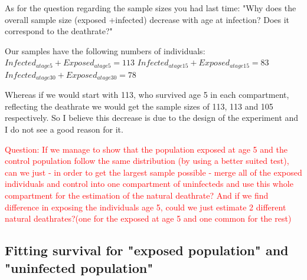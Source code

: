 \documentclass[10pt]{article}         %
\begin{document}
As for the question regarding the sample sizes you had last time: "Why does the overall sample size (exposed +infected) decrease with age at infection? Does it correspond to the deathrate?"

Our samples have the following numbers of individuals:
$Infected_{at age 5} + Exposed_{at age 5} = 113$
$Infected_{at age 15} + Exposed_{at age 15} = 83$
$Infected_{at age 30} + Exposed_{at age 30} = 78$

Whereas if we would start with 113, who survived age 5 in each compartment, reflecting the deathrate we would get the sample sizes of 113, 113 and 105 respectively. So I believe this decrease is due to the design of the experiment and I do not see a good reason for it.

\textcolor{red}{Question: If we manage to show that the population exposed at age 5 and the control population follow the same distribution (by using a better suited test), can we just - in order to get the largest sample possible - merge all of the exposed individuals and control into one compartment of uninfecteds and use this whole compartment for the estimation of the natural deathrate? And if we find difference in exposing the individuals age 5, could we just estimate 2 different natural deathrates?(one for the exposed at age 5 and one common for the rest) }

\subsection{Fitting survival for "exposed population" and "uninfected population"}
\end{document}
